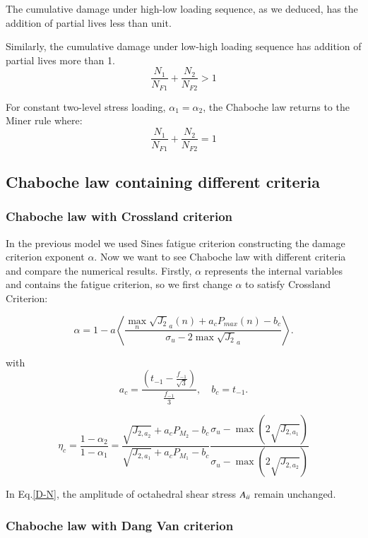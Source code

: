 \documentclass[3p,times,procedia,number]{elsarticle}
\begin{document}
The cumulative damage under high-low loading sequence, as we deduced, has the addition of partial lives less than unit. 

Similarly, the cumulative damage under low-high loading sequence has addition of partial lives more than 1. 
$$\frac{N_1}{N_{F1}}+\frac{N_2}{N_{F2}}>1$$

For constant two-level stress loading, $\alpha_1=\alpha_2$, the Chaboche law returns to the Miner rule where:
$$\frac{N_1}{N_{F1}}+\frac{N_2}{N_{F2}}=1$$
\subsection{Chaboche law containing different criteria}
\subsubsection{Chaboche law with Crossland criterion}

In the previous model we used Sines fatigue criterion constructing the damage criterion exponent $\alpha$. Now we want to see Chaboche law with different criteria and compare the numerical results. Firstly, $\alpha$ represents the internal variables and contains the fatigue criterion, so we first change $\alpha$ to satisfy Crossland Criterion:

\begin{equation}\alpha = 1 - a\left\langle \frac{\max\limits_{n}\sqrt{J_2}_a(n)+a_c{P_{max}(n)}-b_c}{ \sigma_{u} - 2\max\sqrt{J_2}_a}\right\rangle.\end{equation}

with
\begin{equation}
a_c=\frac{(t_{-1}-\frac{f_{-1}}{\sqrt{3}})}{\frac{f_{-1}}{3}}, \quad 
b_c=t_{-1}.
\end{equation}

\begin{equation}\eta_c=\frac{1-\alpha_2}{1-\alpha_1}=
\frac{\sqrt{J_{2,a_2}}+a_cP_{M_2}-b_c}{\sqrt{J_{2,a_1}}+a_cP_{M_1}-b_c}\frac{ \sigma_{u} - \max(2\sqrt{J_{2,a_1}})}{  \sigma_{u} - \max(2\sqrt{J_{2,a_2}})}
\end{equation}

In Eq.\eqref{D-N}, the amplitude of octahedral shear stress $A_{\uppercase\expandafter{\romannumeral2}}$ remain unchanged.

\subsubsection{Chaboche law with Dang Van criterion}
\end{document}
